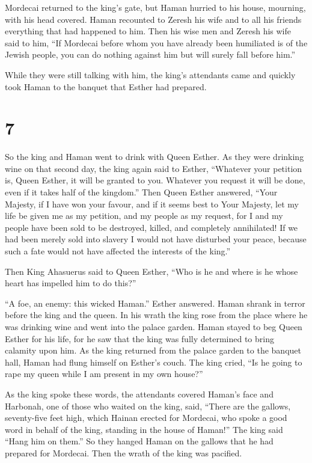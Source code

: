  Mordecai returned to the king's gate, but Haman hurried to
his house, mourning, with his head covered.  Haman
recounted to Zeresh his wife and to all his friends everything that had
happened to him. Then his wise men and Zeresh his wife said to him, ``If
Mordecai before whom you have already been humiliated is of the Jewish
people, you can do nothing against him but will surely fall before
him.''

 While they were still talking with him, the king's
attendants came and quickly took Haman to the banquet that Esther had
prepared.

\hypertarget{section-6}{%
\section{7}\label{section-6}}

 So the king and Haman went to drink with Queen Esther.
 As they were drinking wine on that second day, the king
again said to Esther, ``Whatever your petition is, Queen Esther, it will
be granted to you. Whatever you request it will be done, even if it
takes half of the kingdom.''  Then Queen Esther answered,
``Your Majesty, if I have won your favour, and if it seems best to Your
Majesty, let my life be given me as my petition, and my people as my
request,  for I and my people have been sold to be
destroyed, killed, and completely annihilated! If we had been merely
sold into slavery I would not have disturbed your peace, because such a
fate would not have affected the interests of the king.''

 Then King Ahasuerus said to Queen Esther, ``Who is he and
where is he whose heart has impelled him to do this?''

 ``A foe, an enemy: this wicked Haman.'' Esther answered.
Haman shrank in terror before the king and the queen.  In
his wrath the king rose from the place where he was drinking wine and
went into the palace garden. Haman stayed to beg Queen Esther for his
life, for he saw that the king was fully determined to bring calamity
upon him.  As the king returned from the palace garden to
the banquet hall, Haman had flung himself on Esther's couch. The king
cried, ``Is he going to rape my queen while I am present in my own
house?''

As the king spoke these words, the attendants covered Haman's face
 and Harbonah, one of those who waited on the king, said,
``There are the gallows, seventy-five feet high, which Hainan erected
for Mordecai, who spoke a good word in behalf of the king, standing in
the house of Haman!'' The king said ``Hang him on them.'' 
So they hanged Haman on the gallows that he had prepared for Mordecai.
Then the wrath of the king was pacified.

